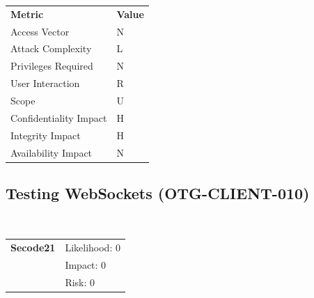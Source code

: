 \documentclass[headsepline,footsepline,footinclude=false,oneside,fontsize=11pt,paper=a4,listof=totoc,bibliography=totoc]{scrbook} %
\begin{document}
\begin{center}
	\begin{tabular}{ll}
		\rowcolor[HTML]{34CDF9}
		{\color[HTML]{ECF4FF} \textbf{Metric}}        & {\color[HTML]{ECF4FF} \textbf{Value}} \\
		\rowcolor[HTML]{BBDAFF}
		{\color[HTML]{333333} Access Vector}          & {\color[HTML]{333333} } N              \\
		\rowcolor[HTML]{ECF4FF}
		{\color[HTML]{333333} Attack Complexity}      & {\color[HTML]{333333} } L              \\
		\rowcolor[HTML]{BBDAFF}
		{\color[HTML]{333333} Privileges Required}    & {\color[HTML]{333333} } N              \\
		\rowcolor[HTML]{ECF4FF}
		{\color[HTML]{333333} User Interaction}       & {\color[HTML]{333333} } R              \\
		\rowcolor[HTML]{BBDAFF}
		{\color[HTML]{333333} Scope}                  & {\color[HTML]{333333} } U              \\
		\rowcolor[HTML]{ECF4FF}
		{\color[HTML]{333333} Confidentiality Impact} & {\color[HTML]{333333} } H              \\
		\rowcolor[HTML]{BBDAFF}
		{\color[HTML]{333333} Integrity Impact}       & {\color[HTML]{333333} } H              \\
		\rowcolor[HTML]{ECF4FF}
		{\color[HTML]{333333} Availability Impact}    & {\color[HTML]{333333} } N
	\end{tabular}
\end{center}
\pagebreak


\subsection{Testing WebSockets (OTG-CLIENT-010)}\
\begin{tabular}{cR{12cm}}
	\textbf{Secode21} & Likelihood: 0\\& Impact: 0\\& Risk: 0
\end{tabular}
\end{document}
